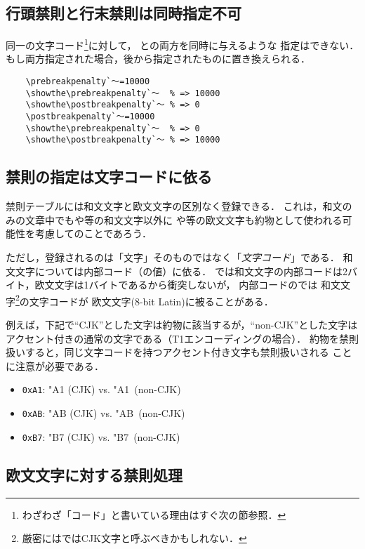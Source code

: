 \documentclass[paper=a4,twocolumn,line_length=24zw,number_of_lines=43]{jlreq}
\begin{document}
\subsection{行頭禁則と行末禁則は同時指定不可}

同一の文字コード\footnote{わざわざ「コード」と書いている理由はすぐ次の節参照．}に対して，
との両方を同時に与えるような
指定はできない．もし両方指定された場合，後から指定されたものに置き換えられる．
\begin{verbatim}
    \prebreakpenalty`〜=10000
    \showthe\prebreakpenalty`〜  % => 10000
    \showthe\postbreakpenalty`〜 % => 0
    \postbreakpenalty`〜=10000
    \showthe\prebreakpenalty`〜  % => 0
    \showthe\postbreakpenalty`〜 % => 10000
\end{verbatim}

\subsection{禁則の指定は文字コードに依る}

禁則テーブルには和文文字と欧文文字の区別なく登録できる．
これは，和文のみの文章中でもや等の和文文字以外に
\codechar{,}や等の欧文文字も約物として使われる可能性を考慮してのことであろう．

ただし，登録されるのは「文字」そのものではなく「\emph{文字コード}」である．
和文文字については内部コード（の値）に依る．
\pTeX では和文文字の内部コードは2バイト，欧文文字は1バイトであるから衝突しないが，
内部コードの\upTeX では
和文文字\footnote{厳密には\upTeX ではCJK文字と呼ぶべきかもしれない．}の文字コードが
欧文文字(8-bit Latin)に被ることがある．

例えば，下記で``CJK''とした文字は約物に該当するが，``non-CJK''とした文字は
アクセント付きの通常の文字である（T1エンコーディングの場合）．
約物を禁則扱いすると，同じ文字コードを持つアクセント付き文字も禁則扱いされる
ことに注意が必要である\cite{uptexfonts2}．
\begin{itemize}%
  \item \texttt{0xA1}: \kchar"A1 (CJK) vs. \char"A1\ (non-CJK)
  \item \texttt{0xAB}: \kchar"AB (CJK) vs. \char"AB\ (non-CJK)
  \item \texttt{0xB7}: \kchar"B7 (CJK) vs. \char"B7\ (non-CJK)
\end{itemize}

\subsection{欧文文字に対する禁則処理}
\end{document}
